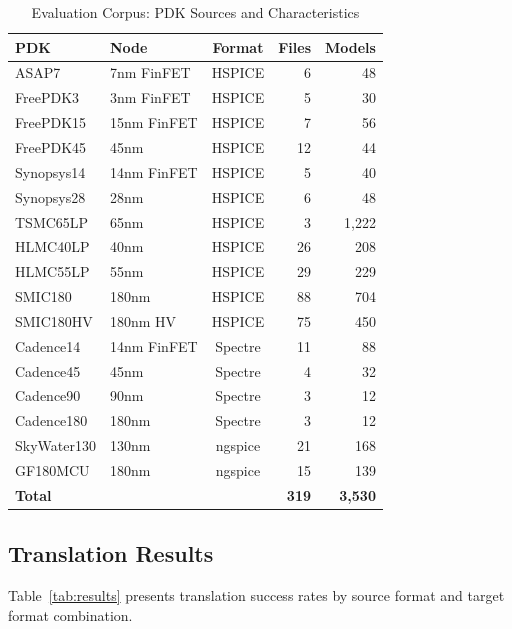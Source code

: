 \documentclass[conference]{IEEEtran}
\begin{document}
\begin{table}[!t]
\caption{Evaluation Corpus: PDK Sources and Characteristics}
\label{tab:corpus}
\centering
\renewcommand{\arraystretch}{1.15}
\begin{tabular}{@{}llcrr@{}}
\toprule
\textbf{PDK} & \textbf{Node} & \textbf{Format} & \textbf{Files} & \textbf{Models} \\
\midrule
ASAP7 & 7nm FinFET & HSPICE & 6 & 48 \\
FreePDK3 & 3nm FinFET & HSPICE & 5 & 30 \\
FreePDK15 & 15nm FinFET & HSPICE & 7 & 56 \\
FreePDK45 & 45nm & HSPICE & 12 & 44 \\
Synopsys14 & 14nm FinFET & HSPICE & 5 & 40 \\
Synopsys28 & 28nm & HSPICE & 6 & 48 \\
TSMC65LP & 65nm & HSPICE & 3 & 1,222 \\
HLMC40LP & 40nm & HSPICE & 26 & 208 \\
HLMC55LP & 55nm & HSPICE & 29 & 229 \\
SMIC180 & 180nm & HSPICE & 88 & 704 \\
SMIC180HV & 180nm HV & HSPICE & 75 & 450 \\
Cadence14 & 14nm FinFET & Spectre & 11 & 88 \\
Cadence45 & 45nm & Spectre & 4 & 32 \\
Cadence90 & 90nm & Spectre & 3 & 12 \\
Cadence180 & 180nm & Spectre & 3 & 12 \\
SkyWater130 & 130nm & ngspice & 21 & 168 \\
GF180MCU & 180nm & ngspice & 15 & 139 \\
\midrule
\textbf{Total} & & & \textbf{319} & \textbf{3,530} \\
\bottomrule
\end{tabular}
\end{table}

\subsection{Translation Results}

Table~\ref{tab:results} presents translation success rates by source format and target format combination.
\end{document}
